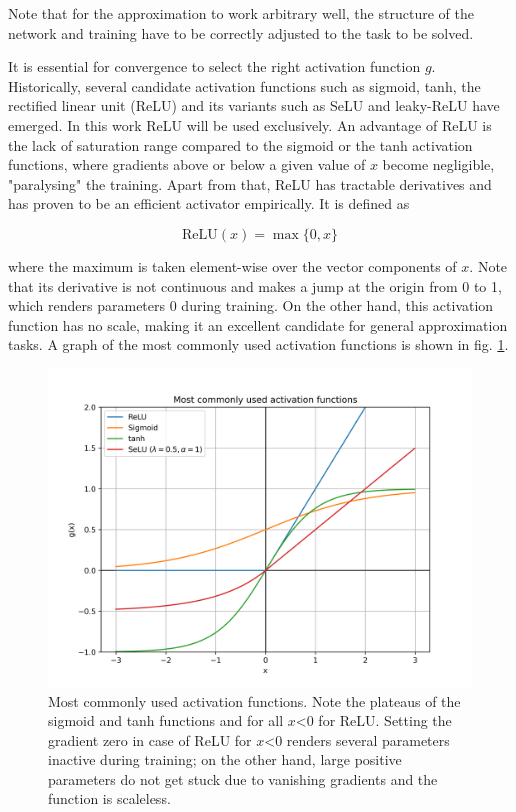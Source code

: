 Note that for the approximation to work arbitrary well, the structure of the network and training have to be correctly adjusted to the task to be solved.

It is essential for convergence to select the right activation function $g$. Historically, several candidate activation functions such as sigmoid, tanh, the rectified linear unit (ReLU) and its variants such as SeLU and leaky-ReLU have emerged. In this work ReLU will be used exclusively. An advantage of ReLU is the lack of saturation range compared to the sigmoid or the tanh activation functions, where gradients above or below a given value of $x$ become negligible, "paralysing" the training. Apart from that, ReLU has tractable derivatives and has proven to be an efficient activator empirically. It is defined as

\begin{equation*}
	\text{ReLU}(x) = \max \{0, x\}
\end{equation*}

where the maximum is taken element-wise over the vector components of $x$. Note that its derivative is not continuous and makes a jump at the origin from 0 to 1, which renders parameters 0 during training. On the other hand, this activation function has no scale, making it an excellent candidate for general approximation tasks. A graph of the most commonly used activation functions is shown in fig. \ref{fig:activations}.

\begin{figure}
	\centering
	\includegraphics[width=0.7\linewidth]{figures/neural_networks/activations}
	\caption{Most commonly used activation functions. Note the plateaus of the sigmoid and tanh functions and for all $x$<0 for ReLU. Setting the gradient zero in case of ReLU for $x$<0 renders several parameters inactive during training; on the other hand, large positive parameters do not get stuck due to vanishing gradients and the function is scaleless.}
	\label{fig:activations}
\end{figure}

